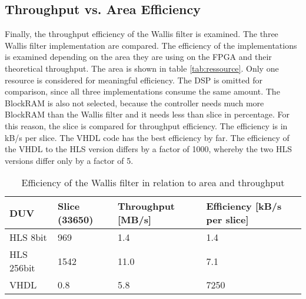 \subsection{Throughput vs. Area Efficiency}
Finally, the throughput efficiency of the Wallis filter is examined. The three
Wallis filter implementation are compared. The efficiency of the
implementations is examined depending on the area they are using on the FPGA
and their theoretical throughput. The area is shown in table 
\ref{tab:ressource}. Only one resource is considered for meaningful efficiency.
The DSP is omitted for comparison, since all three implementations consume the
same amount. The BlockRAM is also not selected, because the controller needs
much more BlockRAM than the Wallis filter and it needs less than slice in percentage. For this reason, the slice is compared for throughput efficiency. The efficiency is in kB/s per slice. The VHDL code has the best efficiency by far. The efficiency of the VHDL to the HLS version differs by a factor of 1000, whereby the two HLS versions differ only by a factor of 5.

\begin{table}[tb!]
    \centering
    \begin{tabular}{l l l l}
        \toprule
        DUV         & Slice (33650) & Throughput [MB/s] & Efficiency [kB/s per
        slice]\\
        \midrule
        HLS 8bit    &  969          & 1.4               & 1.4   \\
        HLS 256bit  &  1542         & 11.0              & 7.1   \\
        VHDL        &  0.8          & 5.8               & 7250  \\
        \bottomrule
    \end{tabular}
    \caption{Efficiency of the Wallis filter in relation to area and throughput}
    \label{tab:efficiency}
\end{table}






